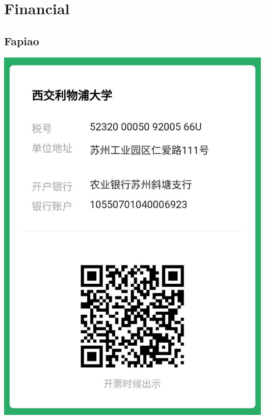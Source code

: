 \documentclass[
]{book}
\begin{document}
\hypertarget{financial}{%
\chapter{Financial}\label{financial}}

\hypertarget{fapiao}{%
\section{Fapiao}\label{fapiao}}

\begin{center}\includegraphics[width=0.8\linewidth]{image/fapiao} \end{center}
\end{document}
